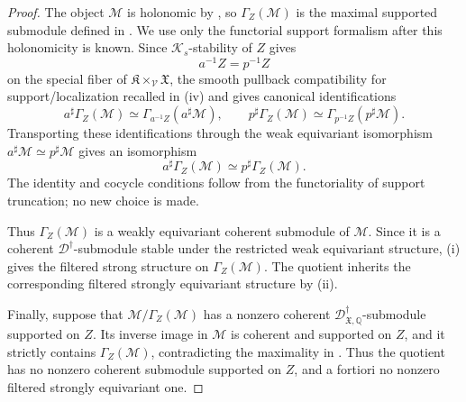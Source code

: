\documentclass[11pt]{amsart}
\theoremstyle{plain}
\theoremstyle{definition}
\theoremstyle{remark}
\begin{document}
\begin{proof}
The object \(\mathcal M\) is holonomic by
, so \(\Gamma_Z(\mathcal M)\) is the
maximal supported submodule defined in .  We use
only the functorial support formalism after this holonomicity is known.  Since
\(\mathcal K_s\)-stability of \(Z\) gives
\[
  a^{-1}Z=p^{-1}Z
\]
on the special fiber of \(\mathfrak K\times_{\mathcal V}\mathfrak X\), the
smooth pullback compatibility for support/localization recalled in
\textup{(iv)} and
\cite[\S2.1, Lemmas 2.1.1--2.1.2]{HuygheSchmidtIntermediate} gives canonical
identifications
\[
  a^\sharp\Gamma_Z(\mathcal M)\simeq
  \Gamma_{a^{-1}Z}(a^\sharp\mathcal M),\qquad
  p^\sharp\Gamma_Z(\mathcal M)\simeq
  \Gamma_{p^{-1}Z}(p^\sharp\mathcal M).
\]
Transporting these identifications through the weak equivariant isomorphism
\(a^\sharp\mathcal M\simeq p^\sharp\mathcal M\) gives an isomorphism
\[
  a^\sharp\Gamma_Z(\mathcal M)\simeq
  p^\sharp\Gamma_Z(\mathcal M).
\]
The identity and cocycle conditions follow from the functoriality of support
truncation; no new choice is made.

Thus \(\Gamma_Z(\mathcal M)\) is a weakly equivariant coherent submodule of
\(\mathcal M\).  Since it is a coherent \(\mathscr D^\dagger\)-submodule
stable under the restricted weak equivariant structure,
\textup{(i)} gives the filtered strong
structure on \(\Gamma_Z(\mathcal M)\).  The quotient inherits the corresponding
filtered strongly equivariant structure by
\textup{(ii)}.

Finally, suppose that \(\mathcal M/\Gamma_Z(\mathcal M)\) has a nonzero coherent
\(\mathscr D^\dagger_{\mathfrak X,\mathbb Q}\)-submodule supported on
\(Z\).  Its inverse image in \(\mathcal M\) is coherent and supported on
\(Z\), and it strictly contains \(\Gamma_Z(\mathcal M)\), contradicting the
maximality in .  Thus the quotient has no
nonzero coherent submodule supported on \(Z\), and a fortiori no nonzero
filtered strongly equivariant one.
\end{proof}
\end{document}
